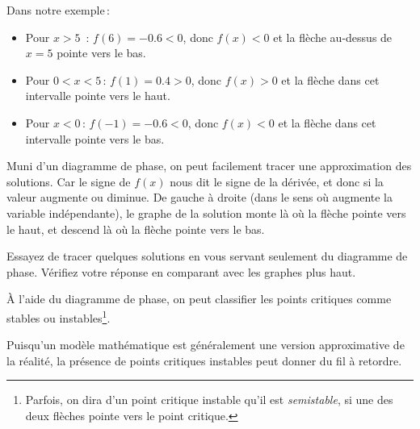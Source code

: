 Dans notre exemple\,:
\begin{itemize}
\item Pour $x > 5$ \,: $f(6) = -0.6 < 0$, donc $f(x) < 0$
et la flèche au-dessus de $x=5$ pointe vers le bas. 
\item Pour $0 < x < 5$\,: $f(1) = 0.4 > 0$, donc $f(x) > 0$ et
la flèche dans cet intervalle pointe vers le haut.
\item Pour $x <0$\,: $f(-1) = -0.6 < 0$, donc $f(x) < 0$ et la flèche dans cet intervalle pointe vers le bas.
\end{itemize} 

\begin{center}
\end{center}

\pagebreak[0]
Muni d'un diagramme de phase, on peut facilement tracer une approximation des solutions. Car le signe de $f(x)$ nous dit le signe de la dérivée, et donc si la valeur augmente ou diminue.  De gauche à droite (dans le sens où augmente la variable indépendante), le graphe de la solution monte là où la flèche pointe vers le haut, et descend là où la flèche pointe vers le bas.  

\begin{exercise}
Essayez de tracer quelques solutions en vous servant seulement du diagramme de phase.  Vérifiez votre réponse en comparant avec les graphes plus haut.
\end{exercise}

\pagebreak[0]
À l'aide du diagramme de phase, on peut classifier les points critiques comme stables ou instables\footnote{Parfois, on dira d'un point critique instable qu'il est \emph{semistable}, si une des deux flèches pointe vers le point critique.}.  

\begin{center}
\end{center}

Puisqu'un modèle mathématique est généralement une version approximative de la réalité, la présence de points critiques instables peut donner du fil à retordre.

